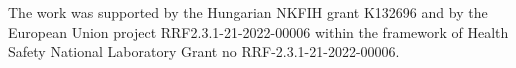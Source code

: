 \documentclass[pdflatex,sn-mathphys-num]{sn-jnl}%
\theoremstyle{thmstyleone}%
\theoremstyle{thmstyletwo}%
\theoremstyle{thmstylethree}%
\begin{document}
\backmatter



The work was supported by the Hungarian NKFIH grant K132696 and by the European Union project RRF2.3.1-21-2022-00006 within the framework of Health Safety National Laboratory Grant no RRF-2.3.1-21-2022-00006.


\end{document}
